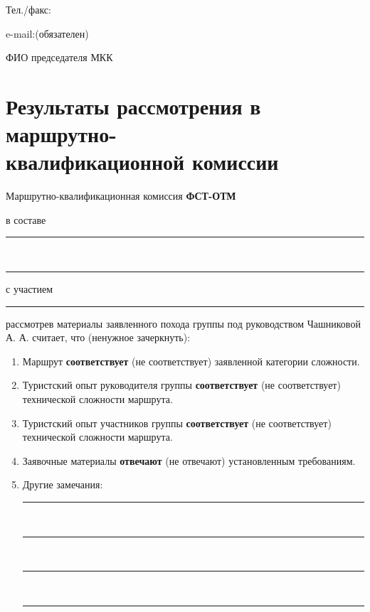 \documentclass[a5paper, 12pt, twoside]{article}
\begin{document}
        Тел./факс:\;\hrulefill
        \vspace{0.5cm}

        e-mail:\;\hrulefill\;(обязателен)
        \vspace{0.5cm}
        
        ФИО председателя МКК\;\hrulefill\,

\newpage %

    \section[]{Результаты рассмотрения в маршрутно-\\квалификационной комиссии}

        Маршрутно-квалификационная комиссия \textbf{ФСТ-ОТМ}
        
        в составе\;\leaders\hrule height 0.2pt\hfill\strut
        \vspace{0.2cm}
        
        \,\leaders\hrule height 0.2pt\hfill\strut
        \vspace{0.2cm}
        
        с участием\;\leaders\hrule height 0.2pt\hfill\strut
        \vspace{0.1cm}
        
        рассмотрев материалы заявленного похода группы под руководством Чашниковой А. А. считает, что (ненужное зачеркнуть):

        \begin{enumerate}
            \item Маршрут \textbf{соответствует} (не соответствует) заявленной категории сложности.
            \item Туристский опыт руководителя группы \textbf{соответствует} (не соответствует) технической сложности маршрута.
            \item Туристский опыт участников группы \textbf{соответствует} (не соответствует) технической сложности маршрута.
            \item Заявочные материалы \textbf{отвечают} (не отвечают) установленным требованиям.
            \item Другие замечания:\;\leaders\hrule height 0.2pt\hfill\strut
            
            \,\leaders\hrule height 0.2pt\hfill\strut

            \,\leaders\hrule height 0.2pt\hfill\strut

            \,\leaders\hrule height 0.2pt\hfill\strut
        \end{enumerate}
        
\end{document}
